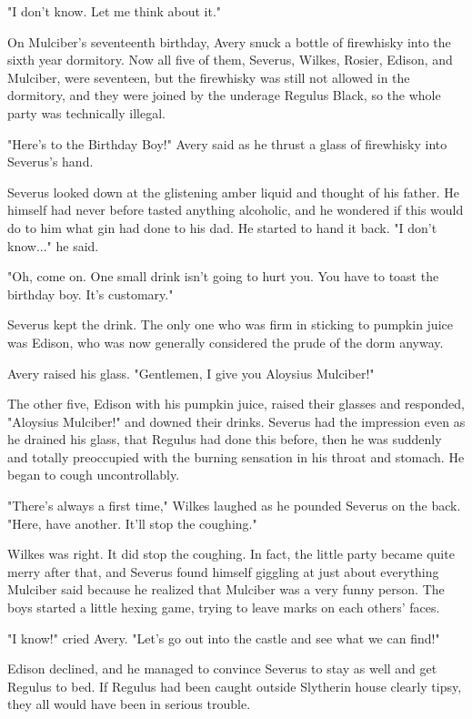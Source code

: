 "I don't know. Let me think about it."

On Mulciber's seventeenth birthday, Avery snuck a bottle of firewhisky into the sixth year dormitory. Now all five of them, Severus, Wilkes, Rosier, Edison, and Mulciber, were seventeen, but the firewhisky was still not allowed in the dormitory, and they were joined by the underage Regulus Black, so the whole party was technically illegal.

"Here's to the Birthday Boy!" Avery said as he thrust a glass of firewhisky into Severus's hand.

Severus looked down at the glistening amber liquid and thought of his father. He himself had never before tasted anything alcoholic, and he wondered if this would do to him what gin had done to his dad. He started to hand it back. "I don't know..." he said.

"Oh, come on. One small drink isn't going to hurt you. You have to toast the birthday boy. It's customary."

Severus kept the drink. The only one who was firm in sticking to pumpkin juice was Edison, who was now generally considered the prude of the dorm anyway.

Avery raised his glass. "Gentlemen, I give you Aloysius Mulciber!"

The other five, Edison with his pumpkin juice, raised their glasses and responded, "Aloysius Mulciber!" and downed their drinks. Severus had the impression even as he drained his glass, that Regulus had done this before, then he was suddenly and totally preoccupied with the burning sensation in his throat and stomach. He began to cough uncontrollably.

"There's always a first time," Wilkes laughed as he pounded Severus on the back. "Here, have another. It'll stop the coughing."

Wilkes was right. It did stop the coughing. In fact, the little party became quite merry after that, and Severus found himself giggling at just about everything Mulciber said because he realized that Mulciber was a very funny person. The boys started a little hexing game, trying to leave marks on each others' faces.

"I know!" cried Avery. "Let's go out into the castle and see what we can find!"

Edison declined, and he managed to convince Severus to stay as well and get Regulus to bed. If Regulus had been caught outside Slytherin house clearly tipsy, they all would have been in serious trouble.

